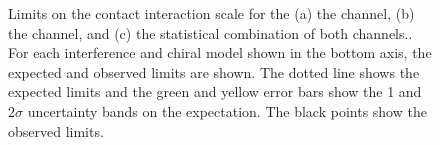 {\begin{figure}[h!]
\vspace{1em}
\caption{Limits on the contact interaction scale \lam for the (a) the \ee channel, (b) the \mm channel, and (c) the statistical combination of both channels..
For each interference and chiral model shown in the bottom axis, the expected and observed limits are shown. The dotted line shows the expected limits and the green and yellow error bars show the 1 and $2\sigma$ uncertainty bands on the expectation. The black points show the observed limits.}
\label{fig:limLamb}
\end{figure}
\clearpage
}

